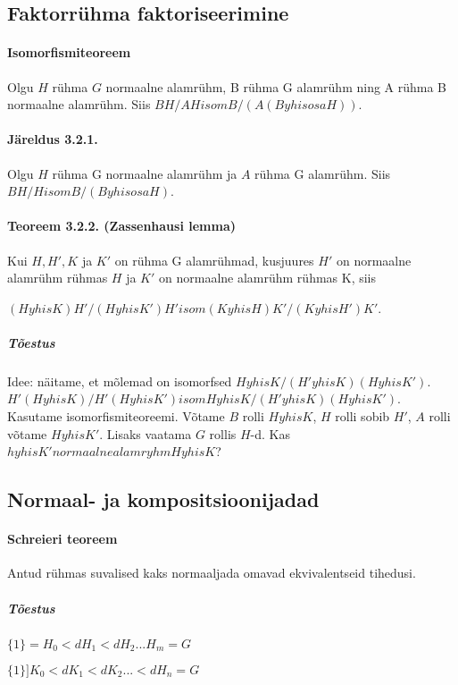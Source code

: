 \documentclass[12pt]{report}
\numberwithin{equation}{section}
\theoremstyle{definition}
\theoremstyle{plain}
\begin{document}
\subsection{Faktorr\"uhma faktoriseerimine}

\paragraph{Isomorfismiteoreem}
Olgu $H$ rühma $G$ normaalne alamr\"uhm, B r\"uhma G alamr\"uhm ning A r\"uhma B normaalne alamr\"uhm. Siis $BH/AH isom B/(A(B yhisosa H))$.

\paragraph{Järeldus 3.2.1.}
Olgu $H$ r\"uhma G normaalne alamr\"uhm ja $A$ r\"uhma G alamr\"uhm. Siis $BH/H isom B/(B yhisosa H)$.

\paragraph{Teoreem 3.2.2. (Zassenhausi lemma)}
Kui $H,H',K$ ja $K'$ on rühma G alamrühmad, kusjuures $H'$ on normaalne alamr\"uhm r\"uhmas $H$ ja $K'$ on normaalne alamr\"uhm r\"uhmas K, siis

$(H yhis K)H'/(H yhis K')H' isom (K yhis H)K'/(K yhis H')K'$.

\subparagraph{Tõestus}

Idee: näitame, et mõlemad on isomorfsed $H yhis K / (H' yhis K)(H yhis K')$.
$H'(H yhis K) / H'(H yhis K') isom H yhis K / (H' yhis K)(H yhis K')$.
Kasutame isomorfismiteoreemi. Võtame $B$ rolli $H yhis K$, $H$ rolli sobib  $H'$, $A$ rolli võtame $H yhis K'$. Lisaks vaatama $G$ rollis $H$-d. Kas $h yhis K' normaalne alamryhm H yhis K$?

\subsection{Normaal- ja kompositsioonijadad}

\paragraph{Schreieri teoreem} Antud r\"uhmas suvalised kaks normaaljada omavad ekvivalentseid tihedusi.

\subparagraph{Tõestus}
$\{1\} = H_0 <d H_1 <d H_2 ... H_m= G$

$\{1\}] K_0 <d K_1 <d K_2 ... <d H_n = G$
\end{document}
